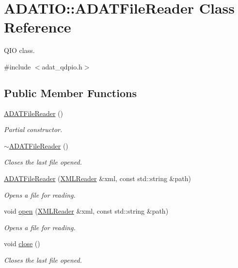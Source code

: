 \hypertarget{classADATIO_1_1ADATFileReader}{}\section{A\+D\+A\+T\+IO\+:\+:A\+D\+A\+T\+File\+Reader Class Reference}
\label{classADATIO_1_1ADATFileReader}


Q\+IO class.  




{\ttfamily \#include $<$adat\+\_\+qdpio.\+h$>$}

\subsection*{Public Member Functions}
\begin{DoxyCompactItemize}
\item 
\mbox{\hyperlink{group__qio_ga800c009d1400eb965cc04a7f90bf4f24}{A\+D\+A\+T\+File\+Reader}} ()
\begin{DoxyCompactList}\small\item\em Partial constructor. \end{DoxyCompactList}\item 
\mbox{\hyperlink{group__qio_ga54a5eea68d2a1c6f5b748f6ba75b7d22}{$\sim$\+A\+D\+A\+T\+File\+Reader}} ()
\begin{DoxyCompactList}\small\item\em Closes the last file opened. \end{DoxyCompactList}\item 
\mbox{\hyperlink{group__qio_ga096a7060d69fd109067404e75f8a06ee}{A\+D\+A\+T\+File\+Reader}} (\mbox{\hyperlink{classADATXML_1_1XMLReader}{X\+M\+L\+Reader}} \&xml, const std\+::string \&path)
\begin{DoxyCompactList}\small\item\em Opens a file for reading. \end{DoxyCompactList}\item 
void \mbox{\hyperlink{group__qio_ga2b2ac967129dfd2d61a79e36034b400f}{open}} (\mbox{\hyperlink{classADATXML_1_1XMLReader}{X\+M\+L\+Reader}} \&xml, const std\+::string \&path)
\begin{DoxyCompactList}\small\item\em Opens a file for reading. \end{DoxyCompactList}\item 
void \mbox{\hyperlink{group__qio_ga8b86dba1600272d26539815146f04078}{close}} ()
\begin{DoxyCompactList}\small\item\em Closes the last file opened. \end{DoxyCompactList}\item 

\end{DoxyCompactItemize}
